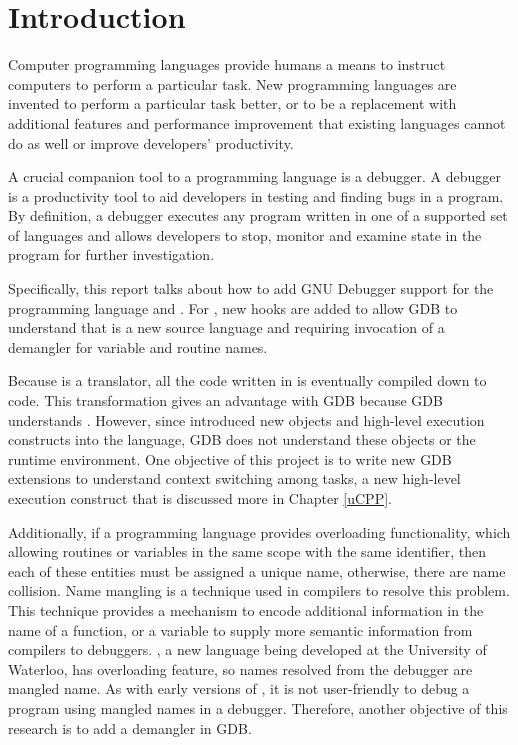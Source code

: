 \chapter{Introduction} \label{introduction}
Computer programming languages provide humans a means to instruct computers to
perform a particular task. New programming languages are
invented to perform a particular task better, or to be a replacement with
additional features and performance improvement that existing languages cannot do as well or
improve developers' productivity.

A crucial companion tool to a programming language is a debugger. A debugger is a productivity tool to aid developers in testing
and finding bugs in a program. By definition, a debugger executes
any program written in one of a supported set of languages and allows developers
to stop, monitor and examine state in the program for further investigation.

Specifically, this report talks about how to add GNU Debugger support for the
programming language \uCPPS and \CFA.
For \CFA, new hooks are added to allow GDB to understand that
\CFAS is a new source language and requiring invocation of a demangler for
variable and routine names.

Because \uCPPS is a translator, all the code written in \uCPPS is eventually
compiled down to \CC code. This transformation gives \uCPPS an advantage with
GDB because GDB understands \CC. However, since \uCPPS introduced new objects
and high-level execution constructs into the language, GDB does not understand
these objects or the runtime environment. One objective of this
project is to write new GDB extensions to understand context switching
among tasks, a new high-level execution construct that is discussed more in Chapter \ref{uCPP}.

Additionally, if a programming language provides overloading functionality,
which allowing routines or variables in the same scope with the
same identifier, then each of these entities must be assigned a unique name, otherwise,
there are name collision.
Name mangling is a technique used in compilers to resolve this
problem. This technique provides a mechanism to encode additional information in the
name of a function, or a variable to supply more semantic information from
compilers to debuggers\cite{reference9}. \CFA, a new language being developed at the University of
Waterloo, has overloading feature, so names resolved from
the debugger are mangled name. As with early versions of \CC, it is not user-friendly to debug a program using
mangled names in
a debugger. Therefore, another objective of this research is to add a \CFAS demangler in GDB.
